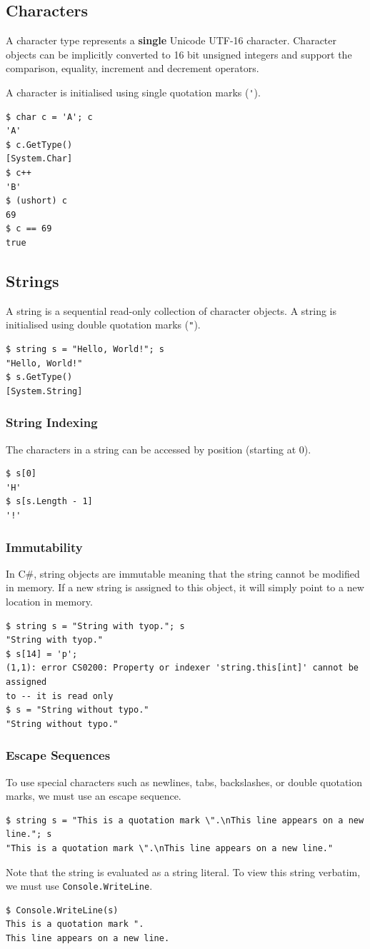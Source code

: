 \documentclass{article}
\begin{document}
\subsection{Characters}
A character type represents a \textbf{single} Unicode UTF-16 character. 
Character objects can be implicitly converted to 16 bit unsigned integers and
support the comparison, equality, increment and \linebreak decrement operators.

A character is initialised using single quotation marks (\lstinline!'!). %
\begin{lstlisting}
$ char c = 'A'; c
'A'
$ c.GetType()
[System.Char]
$ c++
'B'
$ (ushort) c
69
$ c == 69
true
\end{lstlisting}
\subsection{Strings}
A string is a sequential read-only collection of character objects. 
A string is initialised using double quotation marks (\lstinline!"!). %
\begin{lstlisting}
$ string s = "Hello, World!"; s
"Hello, World!"
$ s.GetType()
[System.String]
\end{lstlisting}
\subsubsection{String Indexing}
The characters in a string can be accessed by position (starting at 0).
\begin{lstlisting}
$ s[0]
'H'
$ s[s.Length - 1]
'!'
\end{lstlisting}
\subsubsection{Immutability}
In C\#, string objects are immutable meaning that the string cannot be modified in memory. If a new string is assigned 
to this object, it will simply point to a new location in memory. 
\begin{lstlisting}
$ string s = "String with tyop."; s
"String with tyop."
$ s[14] = 'p';
(1,1): error CS0200: Property or indexer 'string.this[int]' cannot be assigned 
to -- it is read only
$ s = "String without typo."
"String without typo."
\end{lstlisting}
\subsubsection{Escape Sequences}
To use special characters such as newlines, tabs, backslashes, or double quotation marks, we must 
use an escape sequence.
\begin{lstlisting}
$ string s = "This is a quotation mark \".\nThis line appears on a new line."; s
"This is a quotation mark \".\nThis line appears on a new line."
\end{lstlisting}
Note that the string is evaluated as a string literal. To view this string verbatim, we must use 
\lstinline!Console.WriteLine!.
\begin{lstlisting}
$ Console.WriteLine(s) 
This is a quotation mark ".
This line appears on a new line.
\end{lstlisting}
\end{document}
